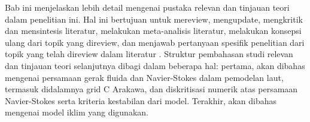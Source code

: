 \vspace{1.5pc}
\begin{spacing}{1.5}
	
	Bab ini menjelaskan lebih detail mengenai pustaka relevan dan tinjauan teori dalam penelitian ini. Hal ini bertujuan untuk mereview, mengupdate, mengkritik dan mensintesis literatur, melakukan meta-analisis literatur, melakukan konsepsi ulang dari topik yang direview, dan menjawab pertanyaan spesifik penelitian dari topik yang telah direview dalam literatur . Struktur pembahasan studi relevan dan tinjauan teori selanjutnya dibagi dalam beberapa hal: pertama, akan dibahas mengenai persamaan gerak fluida dan Navier-Stokes dalam pemodelan laut, termasuk didalamnya grid C Arakawa, dan diskritisasi numerik atas persamaan Navier-Stokes serta kriteria kestabilan dari model. Terakhir, akan dibahas mengenai model iklim yang digunakan.
	
	
\end{spacing}
\vspace{-0.1pc}

